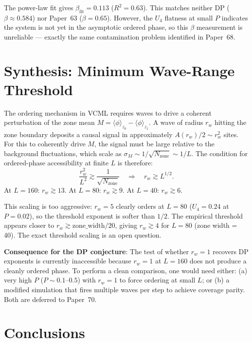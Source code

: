 \documentclass[twocolumn,10pt]{article}
\begin{document}
The power-law fit gives $\beta_\mathrm{fit}=0.113$ ($R^2=0.63$).
This matches neither DP ($\beta\approx0.584$) nor Paper~63 ($\beta=0.65$).
However, the $U_4$ flatness at small $P$ indicates the system is not yet in
the asymptotic ordered phase, so this $\beta$ measurement is unreliable ---
exactly the same contamination problem identified in Paper~68.

\section{Synthesis: Minimum Wave-Range Threshold}

The ordering mechanism in VCML requires waves to drive a coherent perturbation
of the zone mean $M = \langle\phi\rangle_{z_0} - \langle\phi\rangle_{z_1}$.
A wave of radius $r_w$ hitting the zone boundary deposits a causal signal
in approximately $A(r_w)/2 \sim r_w^2$ sites.
For this to coherently drive $M$, the signal must be large relative to the
background fluctuations, which scale as $\sigma_M \sim 1/\sqrt{N_\mathrm{zone}}
\sim 1/L$.
The condition for ordered-phase accessibility at finite $L$ is therefore:
\begin{equation}
  \frac{r_w^2}{L^2} \gtrsim \frac{1}{\sqrt{N_\mathrm{zone}}} \quad\Rightarrow\quad
  r_w \gtrsim L^{1/2}.
  \label{eq:threshold}
\end{equation}
At $L=160$: $r_w \gtrsim 13$.
At $L=80$: $r_w \gtrsim 9$.
At $L=40$: $r_w \gtrsim 6$.

This scaling is too aggressive: $r_w=5$ clearly orders at $L=80$ ($U_4=0.24$
at $P=0.02$), so the threshold exponent is softer than $1/2$.
The empirical threshold appears closer to $r_w \gtrsim \text{zone\_width}/20$,
giving $r_w \gtrsim 4$ for $L=80$ (zone width = 40).
The exact threshold scaling is an open question.

\textbf{Consequence for the DP conjecture}:
The test of whether $r_w=1$ recovers DP exponents is currently inaccessible
because $r_w=1$ at $L=160$ does not produce a cleanly ordered phase.
To perform a clean comparison, one would need either:
(a) very high $P$ ($P\sim0.1$--$0.5$) with $r_w=1$ to force ordering at small $L$; or
(b) a modified simulation that fires multiple waves per step to achieve coverage parity.
Both are deferred to Paper~70.

\section{Conclusions}
\end{document}
